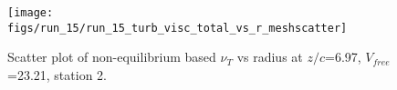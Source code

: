 \begin{figure}[H]
\centering
\texttt{[image: figs/run\_15/run\_15\_turb\_visc\_total\_vs\_r\_meshscatter]}
\caption{Scatter plot of non-equilibrium based $\nu_T$ vs radius at $z/c$=6.97, $V_{free}$=23.21, station 2.}
\label{fig:run_15_turb_visc_total_vs_r_meshscatter}
\end{figure}


